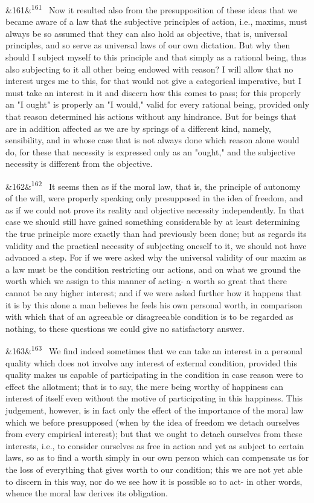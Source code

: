 \documentclass[12pt]{article}
\newcommand{\para}[1][]{\par\noindent\ifx&#1&\else\textsuperscript{\footnotesize #1}~\fi}
\begin{document}
\para[161] Now it resulted also from the presupposition of these ideas that we became aware of a law that the subjective principles of action, i.e., maxims, must always be so assumed that they can also hold as objective, that is, universal principles, and so serve as universal laws of our own dictation. But why then should I subject myself to this principle and that simply as a rational being, thus also subjecting to it all other being endowed with reason? I will allow that no interest urges me to this, for that would not give a categorical imperative, but I must take an interest in it and discern how this comes to pass; for this properly an "I ought" is properly an "I would," valid for every rational being, provided only that reason determined his actions without any hindrance. But for beings that are in addition affected as we are by springs of a different kind, namely, sensibility, and in whose case that is not always done which reason alone would do, for these that necessity is expressed only as an "ought," and the subjective necessity is different from the objective.

\para[162] It seems then as if the moral law, that is, the principle of autonomy of the will, were properly speaking only presupposed in the idea of freedom, and as if we could not prove its reality and objective necessity independently. In that case we should still have gained something considerable by at least determining the true principle more exactly than had previously been done; but as regards its validity and the practical necessity of subjecting oneself to it, we should not have advanced a step. For if we were asked why the universal validity of our maxim as a law must be the condition restricting our actions, and on what we ground the worth which we assign to this manner of acting- a worth so great that there cannot be any higher interest; and if we were asked further how it happens that it is by this alone a man believes he feels his own personal worth, in comparison with which that of an agreeable or disagreeable condition is to be regarded as nothing, to these questions we could give no satisfactory answer.

\para[163] We find indeed sometimes that we can take an interest in a personal quality which does not involve any interest of external condition, provided this quality makes us capable of participating in the condition in case reason were to effect the allotment; that is to say, the mere being worthy of happiness can interest of itself even without the motive of participating in this happiness. This judgement, however, is in fact only the effect of the importance of the moral law which we before presupposed (when by the idea of freedom we detach ourselves from every empirical interest); but that we ought to detach ourselves from these interests, i.e., to consider ourselves as free in action and yet as subject to certain laws, so as to find a worth simply in our own person which can compensate us for the loss of everything that gives worth to our condition; this we are not yet able to discern in this way, nor do we see how it is possible so to act- in other words, whence the moral law derives its obligation.
\end{document}
